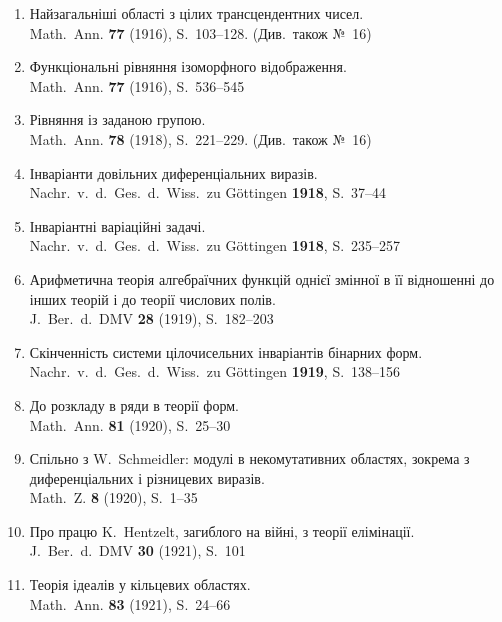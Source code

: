 \documentclass[11pt]{article}
\newcommand{\foreign}[1]{#1}
\begin{document}
\begin{enumerate}[label={\small\arabic*.},leftmargin=2em,itemsep=0.3em]
\item Найзагальніші області з цілих трансцендентних чисел.\\
\foreign{Math.\ Ann.} \textbf{77} (1916), S.~103--128. (Див.\ також №~16)

\item Функціональні рівняння ізоморфного відображення.\\
\foreign{Math.\ Ann.} \textbf{77} (1916), S.~536--545

\item Рівняння із заданою групою.\\
\foreign{Math.\ Ann.} \textbf{78} (1918), S.~221--229. (Див.\ також №~16)

\item Інваріанти довільних диференціальних виразів.\\
\foreign{Nachr.\ v.\ d.\ Ges.\ d.\ Wiss.\ zu Göttingen} \textbf{1918}, S.~37--44

\item Інваріантні варіаційні задачі.\\
\foreign{Nachr.\ v.\ d.\ Ges.\ d.\ Wiss.\ zu Göttingen} \textbf{1918}, S.~235--257

\item Арифметична теорія алгебраїчних функцій однієї змінної в її відношенні до інших теорій і до теорії числових полів.\\
\foreign{J.\ Ber.\ d.\ DMV} \textbf{28} (1919), S.~182--203

\item Скінченність системи цілочисельних інваріантів бінарних форм.\\
\foreign{Nachr.\ v.\ d.\ Ges.\ d.\ Wiss.\ zu Göttingen} \textbf{1919}, S.~138--156

\item До розкладу в ряди в теорії форм.\\
\foreign{Math.\ Ann.} \textbf{81} (1920), S.~25--30

\item Спільно з W.\ Schmeidler: модулі в некомутативних областях, зокрема з диференціальних і різницевих виразів.\\
\foreign{Math.\ Z.} \textbf{8} (1920), S.~1--35

\item Про працю K.\ Hentzelt, загиблого на війні, з теорії елімінації.\\
\foreign{J.\ Ber.\ d.\ DMV} \textbf{30} (1921), S.~101

\item Теорія ідеалів у кільцевих областях.\\
\foreign{Math.\ Ann.} \textbf{83} (1921), S.~24--66


\end{enumerate}
\end{document}
